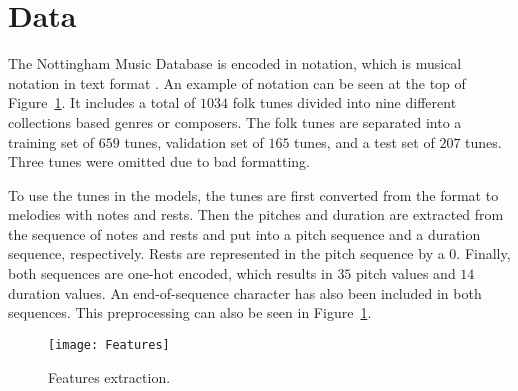 \section{Data}
\label{sec:data}

The Nottingham Music Database \cite{NMD} is encoded in \ABC notation, which is musical notation in text format \cite{ABC}.
An example of \ABC notation can be seen at the top of Figure~\ref{fig:data:features}.
It includes a total of $1034$ folk tunes divided into nine different collections based genres or composers.
The folk tunes are separated into a training set of $659$ tunes, validation set of $165$ tunes, and a test set of $207$ tunes. Three tunes were omitted due to bad formatting.

To use the tunes in the models,
the tunes are first converted from the \ABC format to melodies with notes and rests.
Then the pitches and duration are extracted from the sequence of notes and rests and put into a pitch sequence and a duration sequence, respectively.
Rests are represented in the pitch sequence by a $0$.
Finally, both sequences are one-hot encoded, which results in $35$ pitch values and $14$ duration values.
An end-of-sequence character has also been included in both sequences.
This preprocessing can also be seen in Figure~\ref{fig:data:features}.

\begin{figure}
	\centering
	\texttt{[image: Features]}
	\caption{Features extraction.}
	\label{fig:data:features}
\end{figure}
